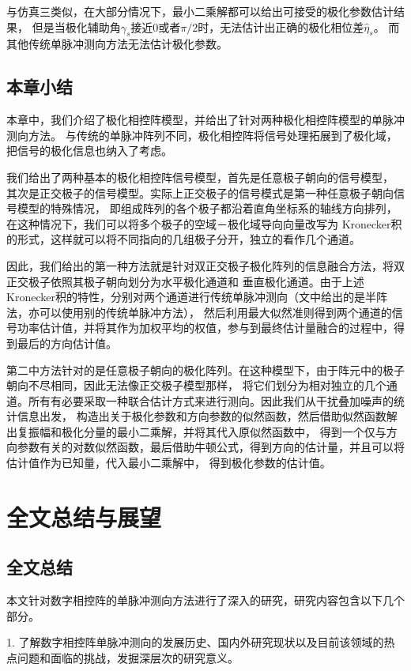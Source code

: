\documentclass[master]{thesis-uestc}
\begin{document}
与仿真三类似，在大部分情况下，最小二乘解都可以给出可接受的极化参数估计结果，
但是当极化辅助角$\gamma_s$接近0或者$\pi/2$时，无法估计出正确的极化相位差$\hat{\eta}_s$。
而其他传统单脉冲测向方法无法估计极化参数。

\section{本章小结}
本章中，我们介绍了极化相控阵模型，并给出了针对两种极化相控阵模型的单脉冲测向方法。
与传统的单脉冲阵列不同，极化相控阵将信号处理拓展到了极化域，把信号的极化信息也纳入了考虑。

我们给出了两种基本的极化相控阵信号模型，首先是任意极子朝向的信号模型，
其次是正交极子的信号模型。实际上正交极子的信号模式是第一种任意极子朝向信号模型的特殊情况，
即组成阵列的各个极子都沿着直角坐标系的轴线方向排列，在这种情况下，我们可以将多个极子的空域－极化域导向向量改写为
Kronecker积的形式，这样就可以将不同指向的几组极子分开，独立的看作几个通道。

因此，我们给出的第一种方法就是针对双正交极子极化阵列的信息融合方法，将双正交极子依照其极子朝向划分为水平极化通道和
垂直极化通道。由于上述Kronecker积的特性，分别对两个通道进行传统单脉冲测向（文中给出的是半阵法，亦可以使用别的传统单脉冲方法），
然后利用最大似然准则得到两个通道的信号功率估计值，并将其作为加权平均的权值，参与到最终估计量融合的过程中，得到最后的方向估计值。

第二中方法针对的是任意极子朝向的极化阵列。在这种模型下，由于阵元中的极子朝向不尽相同，因此无法像正交极子模型那样，
将它们划分为相对独立的几个通道。所有有必要采取一种联合估计方式来进行测向。因此我们从干扰叠加噪声的统计信息出发，
构造出关于极化参数和方向参数的似然函数，然后借助似然函数解出复振幅和极化分量的最小二乘解，并将其代入原似然函数中，
得到一个仅与方向参数有关的对数似然函数，最后借助牛顿公式，得到方向的估计量，并且可以将估计值作为已知量，代入最小二乘解中，
得到极化参数的估计值。

\chapter{全文总结与展望}
\section{全文总结}
本文针对数字相控阵的单脉冲测向方法进行了深入的研究，研究内容包含以下几个部分。

1. 了解数字相控阵单脉冲测向的发展历史、国内外研究现状以及目前该领域的热点问题和面临的挑战，发掘深层次的研究意义。
\end{document}
